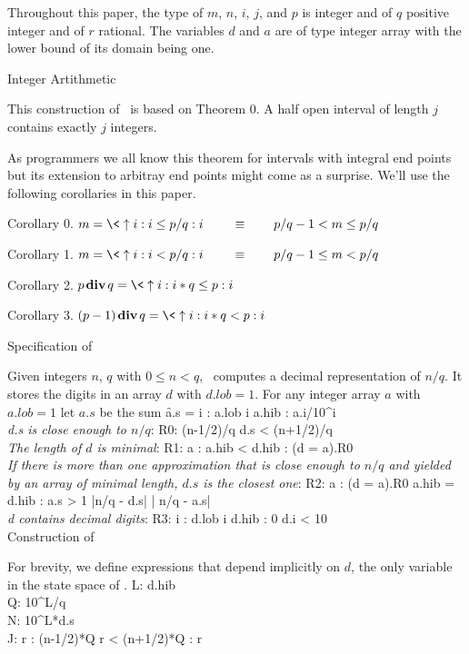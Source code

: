 Throughout this paper, the type of $m$, $n$, $i$, $j$, and $p$ is
integer and of $q$ positive integer and of $r$ rational. The
variables $d$ and $a$ are of type integer array with the lower
bound of its domain being one.

\beginsection Integer Artithmetic

This construction of \out\ is based on
\proclaim Theorem 0.
A half open interval of length $j$ contains exactly $j$ integers.

As programmers we all know this theorem for intervals with integral
end points but its extension to arbitray end points might come as
a surprise. We'll use the following corollaries in this paper.

\proclaim Corollary 0.
$m = \< \mx i : i \le p/q : i\>\meq p/q-1 < m \le p/q$

\proclaim Corollary 1.
$m = \< \mx i : i < p/q : i\>\meq p/q-1 \le m < p/q$

\proclaim Corollary 2.
$ p\div q = \< \mx i : i*q \le p : i\>$

\proclaim Corollary 3.
$(p-1)\div q = \< \mx i : i*q < p : i\>$

\beginsection Specification of \out

Given integers $n$, $q$ with $0 \le n < q$, \out\ computes a decimal
representation of $n/q$. It stores the digits in an array $d$ with
$d.lob = 1$. For any integer array $a$ with $a.lob=1$ let $a.s$
be the sum
\f a.s = \< \su i : a.lob \le i \le a.hib : a.i/10^i\>\\

{\it d.s is close enough to $n/q$\/}:
\nf R0:   (n-1/2)/q \le d.s < (n+1/2)/q\\

{\it The length of $d$ is minimal\/}:
\nf R1:   \< \fa a : a.hib < d.hib : \neg(d \:= a).R0 \>\\ 

{\it
If there is more than one approximation that is close enough to
$n/q$ and yielded by an array of minimal length, $d.s$ is the closest one\/}:
\nf R2: \<\nbr a : (d \:= a).R0 \mand a.hib = d.hib : a.s \> > 1
\mimpl |n/q - d.s| \le | n/q - a.s|\\

{\it d contains decimal digits\/}:
\nf R3:   \< \fa i : d.lob \le i \le d.hib : 0 \le d.i < 10\>\\

\beginsection Construction of \out

For brevity, we define expressions that depend implicitly on $d$, the only
variable in the state space of \out.
\dnf L: d.hib\\Q: 10^L\!/q\\
\dnf N: 10^L*d.s\\J: \<r : (n-1/2)*Q \le r < (n+1/2)*Q : r\>\\

